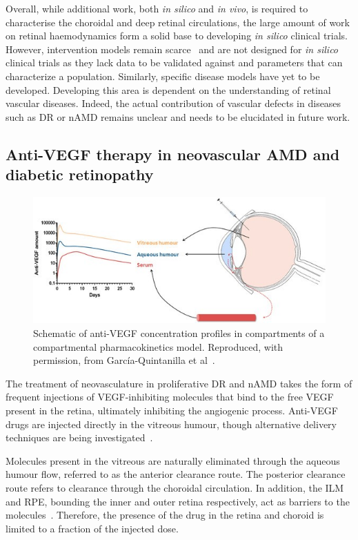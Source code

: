 \documentclass{article}
\begin{document}
Overall, while additional work, both \textit{in silico} and \textit{in vivo}, is required to characterise the choroidal and deep retinal circulations, the large amount of work on retinal haemodynamics form a solid base to developing \textit{in silico} clinical trials.
However, intervention models remain scarce~\cite{Gast_2016,Fawzi_2019} and are not designed for \textit{in silico} clinical trials as they lack data to be validated against and parameters that can characterize a population.
Similarly, specific disease models have yet to be developed.
Developing this area is dependent on the understanding of retinal vascular diseases.
Indeed, the actual contribution of vascular defects in diseases such as DR or nAMD remains unclear and needs to be elucidated in future work.

\subsection{Anti-VEGF therapy in neovascular AMD and diabetic retinopathy}\label{sec:Anti-VEGF}

\begin{figure}[t!]
  \centering
  \includegraphics{AntiVEGF}
  \caption{Schematic of anti-VEGF concentration profiles in compartments of a compartmental pharmacokinetics model. Reproduced, with permission, from Garc\'ia-Quintanilla et al~\cite{GarciaQuintanilla_2019}.}
  \label{fig:AntiVEGF}
\end{figure}

The treatment of neovasculature in proliferative DR and nAMD takes the form of frequent injections of VEGF-inhibiting molecules that bind to the free VEGF present in the retina, ultimately inhibiting the angiogenic process.
Anti-VEGF drugs are injected directly in the vitreous humour, though alternative delivery techniques are being investigated~\cite{Kim_2021}.

Molecules present in the vitreous are naturally eliminated through the aqueous humour flow, referred to as the anterior clearance route.
The posterior clearance route refers to clearance through the choroidal circulation.
In addition, the ILM and RPE, bounding the inner and outer retina respectively, act as barriers to the molecules~\cite{Park_2015}.
Therefore, the presence of the drug in the retina and choroid is limited to a fraction of the injected dose. 
\end{document}
